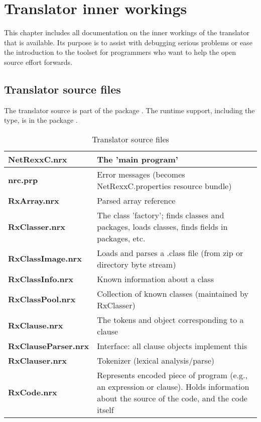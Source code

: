 {


\chapter{Translator inner workings}
This chapter includes all documentation on the inner workings of the
translator that is available. Its purpose is to assist with debugging
serious problems or ease the introduction to the toolset for
programmers who want to help the open source effort forwards.
\section{Translator source files}
The translator source is part of the package
. The runtime support, including the
 type, is in the package . 
\begin{table}\caption{Translator source files}
\begin{tabularx}{\textwidth}{>{\bfseries}lX}
\toprule
  NetRexxC.nrx        & The 'main program'
\\\midrule
  nrc.prp             & Error messages (becomes NetRexxC.properties
                         resource bundle)
\\\midrule
  RxArray.nrx         & Parsed array reference
\\\midrule
  RxClasser.nrx       & The class 'factory'; finds classes and
                         packages, loads classes, finds fields in
                         packages, etc.
\\\midrule
  RxClassImage.nrx    & Loads and parses a .class file (from zip or
                         directory byte stream)
\\\midrule
  RxClassInfo.nrx     & Known information about a class
\\\midrule
  RxClassPool.nrx     & Collection of known classes (maintained by
                         RxClasser)
\\\midrule
  RxClause.nrx        & The tokens and object corresponding to a
  clause
\\\midrule
  RxClauseParser.nrx  & Interface: all clause objects implement this
\\\midrule
  RxClauser.nrx       & Tokenizer (lexical analysis/parse)
\\\midrule
  RxCode.nrx          & Represents encoded piece of program (e.g., an
                         expression or clause).  Holds information about
                         the source of the code, and the code itself

\end{tabularx}
\end{table}}

